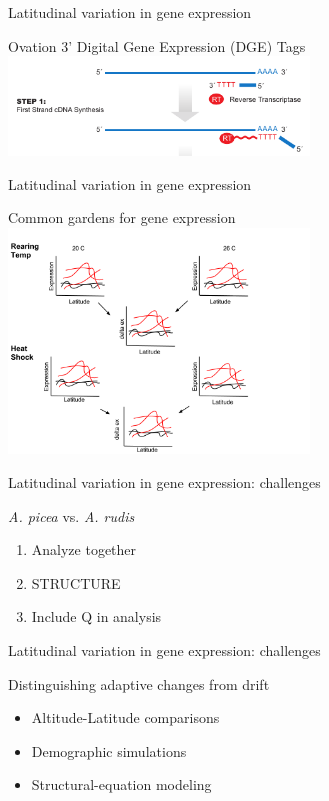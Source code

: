\documentclass{beamer}
\begin{document}
\begin{frame}{Latitudinal variation in gene expression}
	\begin{center}
		\Large{Ovation 3' Digital Gene Expression (DGE) Tags}
		\includegraphics[width=8cm]{ovation_DGE.png}\\
	\end{center}
\end{frame}


\begin{frame}{Latitudinal variation in gene expression}
	\begin{center}
		\large{Common gardens for gene expression}
		\includegraphics[width=8cm]{Latitudinal_gene_expression.png}\\
	\end{center}
\end{frame}


\begin{frame}{Latitudinal variation in gene expression: challenges}

	\begin{block}{\textit{A. picea} vs. \textit{A. rudis}}
		\begin{enumerate}
			\item Analyze together
			\item STRUCTURE
			\item Include Q in analysis
		\end{enumerate}
	\end{block}

\end{frame}


\begin{frame}{Latitudinal variation in gene expression: challenges}

	\begin{block}{Distinguishing adaptive changes from drift}
		\begin{itemize}
			\item Altitude-Latitude comparisons
			\item Demographic simulations
			\item Structural-equation modeling
		\end{itemize}
	\end{block}

\end{frame}
\end{document}
